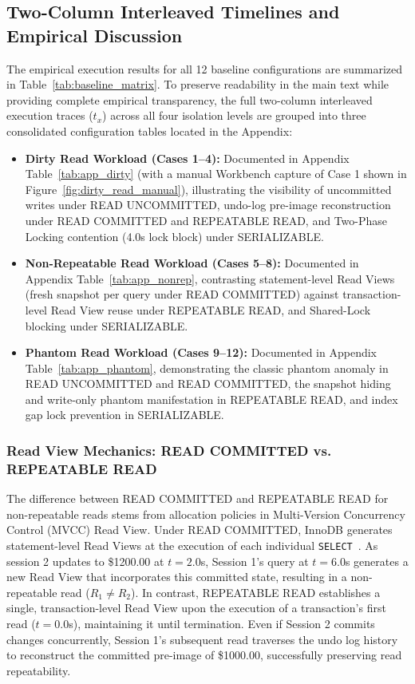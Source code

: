 \documentclass[sigconf, pbalance, nonacm]{acmart}
\begin{document}
\subsection{Two-Column Interleaved Timelines and Empirical Discussion}
The empirical execution results for all 12 baseline configurations are summarized in Table~\ref{tab:baseline_matrix}. To preserve readability in the main text while providing complete empirical transparency, the full two-column interleaved execution traces ($t_x$) across all four isolation levels are grouped into three consolidated configuration tables located in the Appendix:
\begin{itemize}
    \item \textbf{Dirty Read Workload (Cases 1--4):} Documented in Appendix Table~\ref{tab:app_dirty} (with a manual Workbench capture of Case 1 shown in Figure~\ref{fig:dirty_read_manual}), illustrating the visibility of uncommitted writes under READ UNCOMMITTED, undo-log pre-image reconstruction under READ COMMITTED and REPEATABLE READ, and Two-Phase Locking contention (4.0s lock block) under SERIALIZABLE.
    \item \textbf{Non-Repeatable Read Workload (Cases 5--8):} Documented in Appendix Table~\ref{tab:app_nonrep}, contrasting statement-level Read Views (fresh snapshot per query under READ COMMITTED) against transaction-level Read View reuse under REPEATABLE READ, and Shared-Lock blocking under SERIALIZABLE.
    \item \textbf{Phantom Read Workload (Cases 9--12):} Documented in Appendix Table~\ref{tab:app_phantom}, demonstrating the classic phantom anomaly in READ UNCOMMITTED and READ COMMITTED, the snapshot hiding and write-only phantom manifestation in REPEATABLE READ, and index gap lock prevention in SERIALIZABLE.
\end{itemize}

\subsubsection{Read View Mechanics: READ COMMITTED vs. REPEATABLE READ}
The difference between READ COMMITTED and REPEATABLE READ for non-repeatable reads stems from allocation policies in Multi-Version Concurrency Control (MVCC) Read View.
Under READ COMMITTED, InnoDB generates statement-level Read Views at the execution of each individual \texttt{SELECT}~\cite{MySQLConsistentRead,MySQLIsolation}. 
As session 2 updates to \$1200.00 at $t=2.0$s, Session 1's query at $t=6.0$s generates a 
new Read View that incorporates this committed state, resulting in a non-repeatable read ($R_1 \ne R_2$). 
In contrast, REPEATABLE READ establishes a single, transaction-level Read View upon the execution of a transaction's first read ($t=0.0$s), maintaining it until termination. 
Even if Session 2 commits changes concurrently, Session 1's subsequent read traverses the undo log history
to reconstruct the committed pre-image of \$1000.00, successfully preserving read repeatability.
\end{document}
